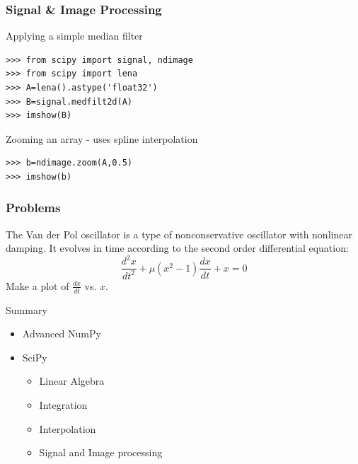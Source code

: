 \documentclass[14pt,compress]{beamer}
\newcounter{time}
\newcommand{\inctime}[1]{\addtocounter{time}{#1}{\tiny \thetime\ m}}
\begin{document}
\begin{frame}[fragile]
  \frametitle{Signal \& Image Processing}
  Applying a simple median filter
  \begin{lstlisting}
>>> from scipy import signal, ndimage
>>> from scipy import lena
>>> A=lena().astype('float32')
>>> B=signal.medfilt2d(A)
>>> imshow(B)
  \end{lstlisting}
  Zooming an array - uses spline interpolation
  \begin{lstlisting}
>>> b=ndimage.zoom(A,0.5)
>>> imshow(b)
  \end{lstlisting}
    \inctime{5}
\end{frame}

\begin{frame}[fragile]
  \frametitle{Problems}
  The Van der Pol oscillator is a type of nonconservative oscillator with nonlinear damping. It evolves in time according to the second order differential equation:
  \begin{equation*}
  \frac{d^2x}{dt^2}+\mu(x^2-1)\frac{dx}{dt}+x= 0
  \end{equation*}
  Make a plot of $\frac{dx}{dt}$ vs. $x$.
\inctime{30}
\end{frame}
\begin{frame}{Summary}
  \begin{itemize}
    \item Advanced NumPy
    \item SciPy
      \begin{itemize}
        \item Linear Algebra
        \item Integration
        \item Interpolation
        \item Signal and Image processing
      \end{itemize}
  \end{itemize}
\end{frame}
\end{document}
